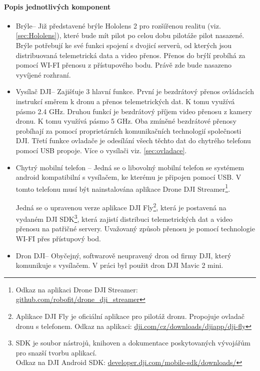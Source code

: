 \paragraph{Popis jednotlivých komponent}
\begin{itemize}
    \item Brýle-- Již představené brýle Hololens 2 pro rozšířenou realitu (viz. \ref{sec:Hololens}), které bude mít pilot po celou dobu pilotáže pilot nasazené. Brýle potřebují ke své funkci spojení s dvojicí serverů, od kterých jsou distribuovaná telemetrická data a video přenos. Přenos do brýlí probíhá za pomocí WI-FI přenosu z přístupového bodu. Právě zde bude nasazeno vyvíjené rozhraní. 
   
    \item Vysílač  DJI\texttrademark-- Zajišťuje 3 hlavní funkce. První je bezdrátový přenos ovládacích instrukcí směrem k dronu a přenos telemetrických dat. K tomu využívá pásmo 2.4 GHz. Druhou funkcí je bezdrátový příjem video přenosu z kamery dronu. K tomu využívá pásmo 5 GHz. Oba zmíněné bezdrátové přenosy probíhají za pomocí proprietárních komunikačních technologií společnosti DJI\texttrademark. Třetí funkce ovladače je odesílání všech těchto dat do chytrého telefonu pomocí USB propoje. Více o vysílači viz. \ref{sec:ovladace}.
    
    \item Chytrý mobilní telefon -- Jedná se o libovolný mobilní telefon se systémem android kompatibilní s vysílačem, ke kterému je připojen pomocí USB. V tomto telefonu musí být nainstalována  aplikace Drone DJI Streamer\footnote{Odkaz na aplikaci Drone DJI Streamer: \href{https://github.com/robofit/drone\_dji\_streamer}{github.com/robofit/drone\_dji\_streamer}}. 

    
    Jedná se o upravenou verze aplikace DJI Fly\footnote{Aplikace DJI Fly je oficiální aplikace pro pilotáž dronu. Propojuje ovladač dronu s telefonem. Odkaz na aplikaci: \href{https://www.dji.com/cz/downloads/djiapp/dji-fly}{dji.com/cz/downloads/djiapp/dji-fly}  }, která je postavená na vydaném DJI SDK\footnote{SDK je soubor nástrojů, knihoven a dokumentace poskytovaných vývojářům pro snazší tvorbu aplikací. \\ Odkaz na DJI Android SDK: \href{https://developer.dji.com/mobile-sdk/downloads/}{developer.dji.com/mobile-sdk/downloads/}},  která zajistí distribuci telemetrických dat a video přenosu na patřičné servery. Uvažovaný způsob přenosu je pomocí technologie WI-FI přes přístupový bod. 
   
    \item Dron DJI\texttrademark \space -- Obyčejný, softwarově neupravený dron od firmy DJI\texttrademark, který komunikuje s vysílačem. V práci byl použit dron DJI Mavic 2 mini.
   

\end{itemize}
